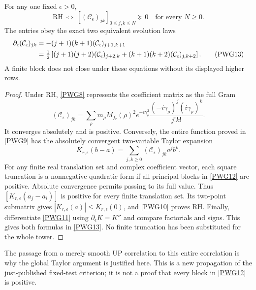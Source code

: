 \begin{theorem}
For any one fixed $\epsilon>0$,
\begin{equation}
 \boxed{\mathrm{RH}\ \Longleftrightarrow\
 [ (\mathcal C_\epsilon)_{jk}]_{0\le j,k\le N}\succeq0
 \quad\text{for every }N\ge0.}                            \tag{PWG12}\label{PWG12}
\end{equation}
The entries obey the exact two equivalent evolution laws
\begin{align}
 \partial_\epsilon(\mathcal C_\epsilon)_{jk}
 & =-(j+1)(k+1)(\mathcal C_\epsilon)_{j+1,k+1}\notag\\
 & =\tfrac12\left[(j+1)(j+2)(\mathcal C_\epsilon)_{j+2,k}
                  +(k+1)(k+2)(\mathcal C_\epsilon)_{j,k+2}\right].
                                                               \tag{PWG13}\label{PWG13}
\end{align}
A finite block does not close under these equations without its displayed higher rows.
\end{theorem}
\begin{proof}
Under RH, \eqref{PWG8} represents the coefficient matrix as the full Gram
\[
 (\mathcal C_\epsilon)_{jk}=
 \sum_\rho m_\rho M_{f_r}(\rho)^2e^{-\epsilon\gamma_\rho^2}
 \frac{(-i\gamma_\rho)^j(i\gamma_\rho)^k}{j!k!}.
\]
It converges absolutely and is positive. Conversely, the entire function proved in \eqref{PWG9} has the absolutely convergent two-variable Taylor expansion
\[
 K_{r,\epsilon}(b-a)
 =\sum_{j,k\ge0}(\mathcal C_\epsilon)_{jk}a^jb^k.
\]
For any finite real translation set and complex coefficient vector, each square truncation is a nonnegative quadratic form if all principal blocks in \eqref{PWG12} are positive. Absolute convergence permits passing to its full value. Thus $[K_{r,\epsilon}(a_j-a_i)]$ is positive for every finite translation set. Its two-point submatrix gives $|K_{r,\epsilon}(a)|\le K_{r,\epsilon}(0)$, and \eqref{PWG10} proves RH. Finally, differentiate \eqref{PWG11} using $\partial_\epsilon K=K''$ and compare factorials and signs. This gives both formulas in \eqref{PWG13}. No finite truncation has been substituted for the whole tower.
\end{proof}

The passage from a merely smooth UP correlation to this entire correlation is why the global Taylor argument is justified here. This is a new propagation of the just-published fixed-test criterion; it is not a proof that every block in \eqref{PWG12} is positive.


